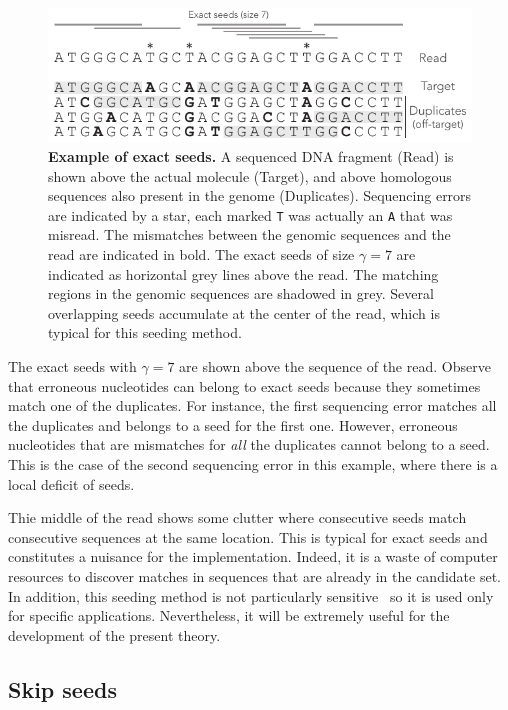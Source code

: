 \documentclass{article}
\begin{document}
\begin{figure}[h]
\centering
\includegraphics[scale=1]{exact_seed_example.pdf}
\caption{\textbf{Example of exact seeds.}
A sequenced DNA fragment (Read) is shown above the actual molecule
(Target), and above homologous sequences also present in the genome
(Duplicates). Sequencing errors are indicated by a star, each marked
\texttt{T} was actually an \texttt{A} that was misread. The mismatches
between the genomic sequences and the read are indicated in bold. The
exact seeds of size $\gamma = 7$ are indicated as horizontal grey lines
above the read. The matching regions in the genomic sequences are
shadowed in grey. Several overlapping seeds accumulate at the center of
the read, which is typical for this seeding method.}
\label{fig:exact_seed_example}
\end{figure}

The exact seeds with $\gamma=7$ are shown above the sequence of the read.
Observe that erroneous nucleotides can belong to exact seeds because they
sometimes match one of the duplicates. For instance, the first sequencing
error matches all the duplicates and belongs to a seed for the first one.
However, erroneous nucleotides that are mismatches for \emph{all} the
duplicates cannot belong to a seed. This is the case of the second
sequencing error in this example, where there is a local deficit of
seeds.

Thie middle of the read shows some clutter where consecutive seeds
match consecutive sequences at the same location. This is typical for
exact seeds and constitutes a nuisance for the implementation. Indeed, it
is a waste of computer resources to discover matches in sequences that are
already in the candidate set. In addition, this seeding method is not
particularly sensitive~\cite{pmid11934743} so it is used only for specific
applications. Nevertheless, it will be extremely useful for the
development of the present theory.


\subsection{Skip seeds}
\end{document}
